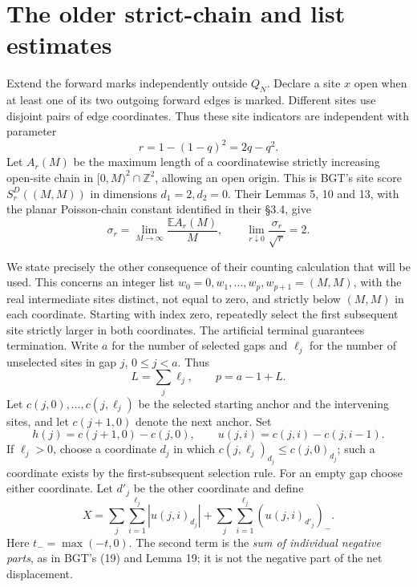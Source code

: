 \documentclass[11pt]{article}
\newcommand{\E}{\mathbb E}
\newcommand{\Z}{\mathbb Z}
\newcommand{\negp}[1]{(#1)_{-}}
\begin{document}
\section{The older strict-chain and list estimates}

Extend the forward marks independently outside $Q_N$. Declare a site
$x$ open when at least one of its two outgoing forward edges is marked.
Different sites use disjoint pairs of edge coordinates. Thus
these site indicators are independent with parameter
\begin{equation}\label{r}
 r=1-(1-q)^2=2q-q^2.
\end{equation}
Let $A_r(M)$ be the maximum length of a coordinatewise strictly
increasing open-site chain in $[0,M)^2\cap\Z^2$, allowing an open
origin. This is BGT's site score $S_r^D((M,M))$ in dimensions
$d_1=2,d_2=0$. Their Lemmas 5, 10 and 13, with the planar
Poisson-chain constant identified in their \S3.4, give
\begin{equation}\label{chain}
 \sigma_r=\lim_{M\to\infty}\frac{\E A_r(M)}{M},
 \qquad \lim_{r\downarrow0}\frac{\sigma_r}{\sqrt r}=2.
\end{equation}

We state precisely the other consequence of their counting
calculation that will be used. This concerns an integer list
$w_0=0,w_1,\ldots,w_p,w_{p+1}=(M,M)$, with the real intermediate
sites distinct, not equal to zero, and strictly below $(M,M)$ in
each coordinate. Starting with index zero, repeatedly select the
first subsequent site strictly larger in both coordinates. The
artificial terminal guarantees termination. Write $a$ for the number
of selected gaps and $\ell_j$ for the number of unselected sites in
gap $j$, $0\le j<a$. Thus
\[
 L=\sum_j\ell_j,\qquad p=a-1+L.
\]
Let $c(j,0),\ldots,c(j,\ell_j)$ be the selected starting anchor and
the intervening sites, and let $c(j+1,0)$ denote the next anchor.
Set
\[
 h(j)=c(j+1,0)-c(j,0),\qquad
 u(j,i)=c(j,i)-c(j,i-1).
\]
If $\ell_j>0$, choose a coordinate $d_j$ in which
$c(j,\ell_j)_{d_j}\le c(j,0)_{d_j}$; such a coordinate exists by
the first-subsequent selection rule. For an empty gap choose either
coordinate. Let $d'_j$ be the other coordinate and define
\begin{equation}\label{X}
 X=\sum_j\sum_{i=1}^{\ell_j}|u(j,i)_{d_j}|
   +\sum_j\sum_{i=1}^{\ell_j}\negp{u(j,i)_{d'_j}}.
\end{equation}
Here $t_-=\max(-t,0)$. The second term is the \emph{sum of individual
negative parts}, as in BGT's (19) and Lemma 19; it is not the
negative part of the net displacement.
\end{document}
